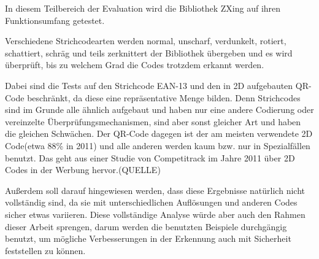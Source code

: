 In diesem Teilbereich der Evaluation wird die Bibliothek ZXing auf ihren Funktionsumfang getestet.

Verschiedene Strichcodearten werden normal, unscharf, verdunkelt, rotiert, schattiert, schräg und teils zerknittert der Bibliothek übergeben und es wird überprüft, bis zu welchem Grad die Codes trotzdem erkannt werden.

Dabei sind die Tests auf den Strichcode EAN-13 und den in 2D aufgebauten QR-Code beschränkt, da diese eine repräsentative Menge bilden. Denn Strichcodes sind im Grunde alle ähnlich aufgebaut und haben nur eine andere Codierung oder vereinzelte Überprüfungsmechanismen, sind aber sonst gleicher Art und haben die gleichen Schwächen. Der QR-Code dagegen ist der am meisten verwendete 2D Code(etwa 88\% in 2011) und alle anderen werden kaum bzw. nur in Spezialfällen benutzt. Das geht aus einer Studie von Competitrack im Jahre 2011 über 2D Codes in der Werbung hervor.(QUELLE)

Außerdem soll darauf hingewiesen werden, dass diese Ergebnisse natürlich nicht vollständig sind, da sie mit unterschiedlichen Auflösungen und anderen Codes sicher etwas variieren. Diese vollständige Analyse würde aber auch den Rahmen dieser Arbeit sprengen, darum werden die benutzten Beispiele durchgängig benutzt, um mögliche Verbesserungen in der Erkennung auch mit Sicherheit feststellen zu können.
